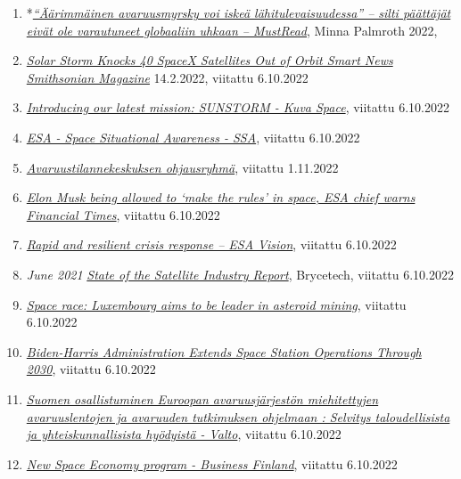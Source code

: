 \documentclass[nobib,finnish,oneside,openany,notoc,a4paper]{tufte-book}
\begin{document}
{\begin{enumerate}
{{  push for global debate on giant satellite swarms}}, Nature, 16.7.2021
\item
    *\href{https://www.mustread.fi/artikkelit/aarimmainen-avaruusmyrsky-voi-iskea-lahitulevaisuudessa-silti-paattajat-eivat-ole-varautuneet-globaaliin-uhkaan/}{\emph{``Äärimmäinen
    avaruusmyrsky voi iskeä lähitulevaisuudessa'' -- silti päättäjät
    eivät ole varautuneet globaaliin uhkaan -- MustRead}}, Minna
    Palmroth 2022,
\item
  \href{https://www.smithsonianmag.com/smart-news/solar-storm-knocks-40-spacex-satellites-out-of-orbit-180979566/}{\emph{Solar
  Storm Knocks 40 SpaceX Satellites Out of Orbit \textbar{} Smart
  News\textbar{} Smithsonian Magazine}} 14.2.2022, viitattu 6.10.2022
\item
  \href{https://kuvaspace.com/2019/06/04/introducing-our-latest-mission-sunstorm/}{\emph{Introducing
  our latest mission: SUNSTORM - Kuva Space}}, viitattu 6.10.2022
\item
  \href{https://www.esa.int/About_Us/ESAC/Space_Situational_Awareness_-_SSA}{\emph{ESA
  - Space Situational Awareness - SSA}}, viitattu 6.10.2022
\item
  \href{https://valtioneuvosto.fi/hanke?tunnus=LVM035:00/2022}{\emph{Avaruustilannekeskuksen
  ohjausryhmä}}, viitattu 1.11.2022
\item
  \href{https://www.ft.com/content/7d561078-37c7-4902-a094-637b81a26241}{\emph{Elon
  Musk being allowed to `make the rules' in space, ESA chief warns
  \textbar{} Financial Times}}, viitattu 6.10.2022
\item
  \href{https://vision.esa.int/rapid-and-resilient-crisis-response/}{\emph{Rapid
  and resilient crisis response -- ESA Vision}}, viitattu 6.10.2022
\item
  \emph{June 2021
  }\href{https://brycetech.com/reports/report-documents/SIA_SSIR_2021.pdf}{\emph{State
  of the Satellite Industry Report}}, Brycetech, viitattu 6.10.2022
\item
  \href{https://miningglobal.com/supply-chain-and-operations/space-race-luxembourg-aims-be-leader-asteroid-mining}{\emph{Space
  race: Luxembourg aims to be leader in asteroid mining}}, viitattu
  6.10.2022
\item
  \href{https://blogs.nasa.gov/spacestation/2021/12/31/biden-harris-administration-extends-space-station-operations-through-2030/}{\emph{Biden-Harris
  Administration Extends Space Station Operations Through 2030}},
  viitattu 6.10.2022
\item
  \href{https://urn.fi/URN:ISBN:978-952-327-704-5}{\emph{Suomen
  osallistuminen Euroopan avaruusjärjestön miehitettyjen avaruuslentojen
  ja avaruuden tutkimuksen ohjelmaan : Selvitys taloudellisista ja
  yhteiskunnallisista hyödyistä - Valto}}, viitattu 6.10.2022
\item
  \href{https://www.businessfinland.fi/en/for-finnish-customers/services/programs/new-space-economy}{\emph{New
  Space Economy program - Business Finland}}, viitattu 6.10.2022
\end{enumerate}

}
\end{document}
